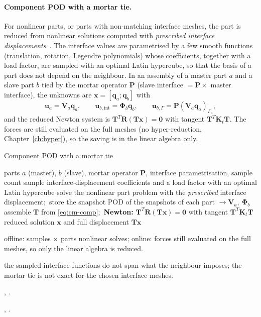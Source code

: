 
\paragraph{Component POD with a mortar tie.}
For nonlinear parts, or parts with non-matching interface meshes, the part is reduced from nonlinear solutions computed with \emph{prescribed interface displacements}~\cite{ritzert2025}. The interface values are parametrised by a few smooth functions (translation, rotation, Legendre polynomials) whose coefficients, together with a load factor, are sampled with an optimal Latin hypercube, so that the basis of a part does not depend on the neighbour. In an assembly of a master part $a$ and a slave part $b$ tied by the mortar operator $\bm P$ (slave interface $=\bm P\times$ master interface), the unknowns are $\bm x=[\bm q_a;\bm q_b]$ with
\begin{equation}\label{eq:cm-comp}
\bm u_a=\bm V_a\bm q_a,\qquad \bm u_{b,\mathrm{int}}=\bm\Phi_b\bm q_b,\qquad \bm u_{b,\Gamma}=\bm P(\bm V_a\bm q_a)_{\Gamma_a},
\end{equation}
and the reduced Newton system is $\bm T^T\bm R(\bm T\bm x)=\bm 0$ with tangent $\bm T^T\bm K_t\bm T$. The forces are still evaluated on the full meshes (no hyper-reduction, Chapter~\ref{ch:hyper}), so the saving is in the linear algebra only.

\begin{algbox}{Component POD with a mortar tie}
\begin{pseudo}
\Require parts $a$ (master), $b$ (slave), mortar operator $\bm P$, interface parametrisation, sample count
\State sample interface-displacement coefficients and a load factor with an optimal Latin hypercube
  \State solve the nonlinear part problem with the \emph{prescribed} interface displacement;\ store the snapshot
\EndFor
\State POD of the snapshots of each part $\to\bm V_a,\ \bm\Phi_b$ 
\State assemble $\bm T$ from \eqref{eq:cm-comp};\ \textbf{Newton:} $\bm T^T\bm R(\bm T\bm x)=\bm0$ with tangent $\bm T^T\bm K_t\bm T$
\Ensure reduced solution $\bm x$ and full displacement $\bm T\bm x$
\end{pseudo}
\begin{algdet}
\item[Cost] offline: samples $\times$ parts nonlinear solves; online: forces still evaluated on the full meshes, so only the linear algebra is reduced.
\item[Fails when] the sampled interface functions do not span what the neighbour imposes; the mortar tie is not exact for the chosen interface meshes.
\item[Code] , .
\item[Verified in] , .
\end{algdet}
\end{algbox}

